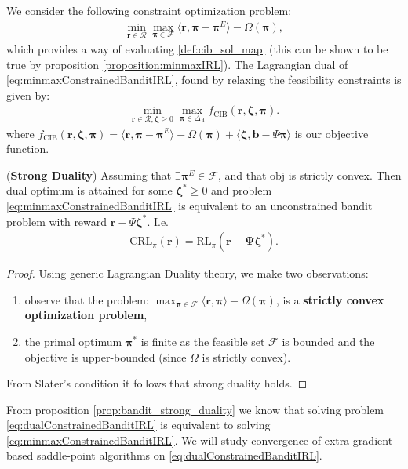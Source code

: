 We consider the following constraint optimization problem:
\begin{equation}
    \label{eq:minmaxConstrainedBanditIRL}
    \begin{aligned}
        \min_{\bm{r}\in\mathcal{R}}\max_{\bm{\pi}\in\mathcal{F}} \langle \bm{r}, \bm{\pi}-\bm{\pi}^E \rangle-\Omega(\bm{\pi}),
    \end{aligned}
\end{equation}
which provides a way of evaluating \ref{def:cib_sol_map} (this can be shown to be true by proposition \ref{proposition:minmaxIRL}). The Lagrangian dual of \ref{eq:minmaxConstrainedBanditIRL}, found by relaxing the feasibility constraints is given by:
\begin{equation}
    \label{eq:dualConstrainedBanditIRL}
    \begin{aligned}
        \min_{\bm{r}\in\mathcal{R},\bm{\zeta} \geq 0}\max_{\bm{\pi}\in\Delta_{A}} f_\text{CIB}(\bm{r},\bm{\zeta},\bm{\pi}).
    \end{aligned}
\end{equation}
where $f_\text{CIB}(\bm{r},\bm{\zeta},\bm{\pi}) = \langle \bm{r}, \bm{\pi}-\bm{\pi}^E \rangle -\Omega(\bm{\pi}) + \langle \bm{\zeta}, \bm{b}-\Psi \bm{\pi}\rangle$ is our objective function.
\begin{proposition}
    \label{prop:bandit_strong_duality}
    (\textbf{Strong Duality}) Assuming that $\exists \bm{\pi}^E\in\mathcal{F}$, and that $\text{obj}$ is strictly convex. Then dual optimum is attained for some $\bm{\zeta}^* \geq 0$ and problem \ref{eq:minmaxConstrainedBanditIRL} is equivalent to an unconstrained bandit problem with reward $\bm{r}-\Psi \bm{\zeta}^*$. I.e. 
    \begin{align*}
        \text{CRL}_\pi(\bm{r}) = \text{RL}_\pi(\bm{r} - \bm{\Psi} \bm{\zeta}^*).
    \end{align*}
\end{proposition}
\begin{proof}
    Using generic Lagrangian Duality theory, we make two observations:
    \begin{enumerate}
        \item observe that the problem: $\max_{\bm{\pi} \in \mathcal{F}} \langle \bm{r}, \bm{\pi} \rangle - \Omega(\bm{\pi})$, is a \textbf{strictly convex optimization problem},
        \item the primal optimum $\bm{\pi}^*$ is finite as the feasible set $\mathcal{F}$ is bounded and the objective is upper-bounded (since $\Omega$ is strictly convex).
    \end{enumerate}
    From Slater's condition it follows that strong duality holds.
\end{proof}
\noindent
From proposition \ref{prop:bandit_strong_duality} we know that solving problem \ref{eq:dualConstrainedBanditIRL} is equivalent to solving \ref{eq:minmaxConstrainedBanditIRL}. We will study convergence of extra-gradient-based saddle-point algorithms on \ref{eq:dualConstrainedBanditIRL}. \\%


